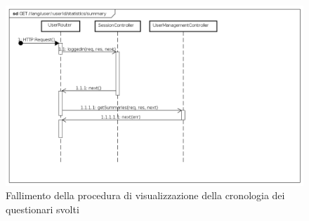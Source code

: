 \begin{itemize}
\begin{figure}[ht]
	\centering
	\includegraphics[scale=0.40]{UML/DiagrammiDiSequenza/Back-end/GET_LangUserUserIdStatisticsSummaryFailure.png}
	\caption{Fallimento della procedura di visualizzazione della cronologia dei questionari svolti}
\end{figure}
\FloatBarrier

\end{itemize}

